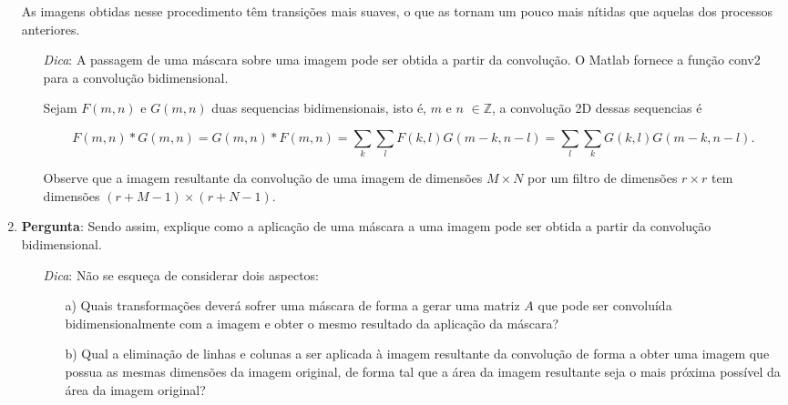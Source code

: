 \documentclass[11pt]{article}
\begin{document}
\begin{enumerate}
As imagens obtidas nesse procedimento têm transições mais suaves, o que as tornam um pouco mais nítidas que aquelas dos processos anteriores.

\begin{itemize}
\item[\textit{Dica}:] A passagem de uma máscara sobre uma imagem pode ser obtida a partir da convolução. O \textsf{Matlab} fornece a função \textsf{conv2} para a convolução bidimensional. 

Sejam $F(m,n)$ e $G(m,n)$ duas sequencias bidimensionais, isto é, $m$ e $n$ $\in \mathbb{Z}$, a convolução 2D dessas sequencias é
\begin{footnotesize}
\begin{equation}
F(m,n)*G(m,n) = G(m,n)*F(m,n) = \sum_k\sum_l F(k,l)G(m-k,n-l) = \sum_l\sum_k G(k,l)G(m-k,n-l).
\end{equation}\end{footnotesize}
Observe que a imagem resultante da convolução de uma imagem de dimensões $M\times N$ por um filtro de dimensões $r\times r$ tem dimensões $(r+M-1) \times (r+N-1)$. 
\end{itemize}

\item \textbf{Pergunta}: Sendo assim, explique como a aplicação de uma máscara a uma imagem pode ser obtida a partir da convolução bidimensional. 

\begin{itemize}
\item[\textit{Dica}:] Não se esqueça de considerar dois aspectos:

\begin{itemize}
\item[a)] Quais transformações deverá sofrer uma máscara de forma a gerar uma matriz $A$ que pode ser convoluída bidimensionalmente com a imagem e obter o mesmo resultado da aplicação da máscara?

\item[b)] Qual a eliminação de linhas e colunas a ser aplicada à imagem resultante da convolução de forma a obter uma imagem que possua as mesmas dimensões da imagem original, de forma tal que a área da imagem resultante seja o mais próxima possível da área da imagem original?
\end{itemize}
\end{itemize}

\end{enumerate}
\end{document}
